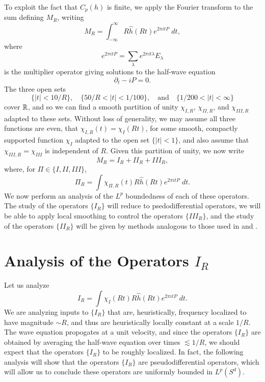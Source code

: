
To exploit the fact that $C_p(h)$ is finite, we apply the Fourier transform to the sum defining $M_R$, writing
%
\[ M_R = \int_{-\infty}^\infty R \widehat{h}(Rt) e^{2 \pi i t P}\; dt, \]
%
where
%
\[ e^{2 \pi i t P} = \sum_\lambda e^{2 \pi i t \lambda} E_\lambda \]
%
is the multiplier operator giving solutions to the half-wave equation
%
\[ \partial_t - i P = 0. \]
%
%
%
%
%
%
%
The three open sets
%
\[ \{ |t| < 10/R \}, \quad \{ 50/R < |t| < 1/100 \}, \quad\text{and}\quad \{ 1/200 < |t| < \infty \} \]
%
cover $\operatorname{\mathbb{R}}$, and so we can find a smooth partition of unity $\chi_{I,R}$, $\chi_{II,R}$, and $\chi_{III,R}$ adapted to these sets. Without loss of generality, we may assume all three functions are even, that $\chi_{I,R}(t) = \chi_I(Rt)$, for some smooth, compactly supported function $\chi_I$ adapted to the open set $\{ |t| < 1 \}$, and also assume that $\chi_{III,R} = \chi_{III}$ is independent of $R$. Given this partition of unity, we now write
%
\[ M_R = I_R + II_R + III_R, \]
%
where, for $\Pi \in \{ I, II, III \}$,
%
\[ \Pi_R = \int \chi_{\Pi,R}(t) R \widehat{h}(Rt) e^{2 \pi i t P}\; dt. \]
%
We now perform an analysis of the $L^p$ boundedness of each of these operators. The study of the operators $\{ I_R \}$ will reduce to psedodifferential operators, we will be able to apply local smoothing to control the operators $\{ III_R \}$, and the study of the operators $\{ II_R \}$ will be given by methods analogous to those used in \cite{HeoandNazarovandSeeger} and \cite{LeeSeeger}.

\section{Analysis of the Operators $I_R$}

Let us analyze
%
\[ I_R = \int \chi_I(Rt) R \widehat{h}(Rt) e^{2 \pi i t P}\; dt. \]
%
We are analyzing inputs to $\{ I_R \}$ that are, heuristically, frequency localized to have magnitude $\sim R$, and thus are heuristically locally constant at a scale $1/R$. The wave equation propogates at a unit velocity, and since the operators $\{ I_R \}$ are obtained by averaging the half-wave equation over times $\lesssim 1/R$, we should expect that the operators $\{ I_R \}$ to be roughly localized. In fact, the following analysis will show that the operators $\{ I_R \}$ are pseudodifferential operators, which will allow us to conclude these operators are uniformly bounded in $L^p(S^d)$.

